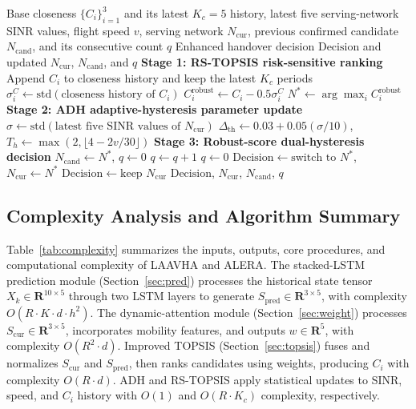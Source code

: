 \documentclass[preprint,12pt]{elsarticle}
\begin{document}
\begin{algorithm}[H]
\caption{ALERA risk-aware vertical-handover enhancement procedure}
\label{alg:alera}
\small
\begin{algorithmic}[1]
\Require Base closeness $\{C_i\}_{i=1}^{3}$ and its latest $K_c=5$ history, latest five serving-network SINR values, flight speed $v$, serving network $N_{\mathrm{cur}}$, previous confirmed candidate $N_{\mathrm{cand}}$, and its consecutive count $q$
\Ensure Enhanced handover decision $\mathrm{Decision}$ and updated $N_{\mathrm{cur}}$, $N_{\mathrm{cand}}$, and $q$
\State \textbf{Stage 1: RS-TOPSIS risk-sensitive ranking}
 \State Append $C_i$ to closeness history and keep the latest $K_c$ periods
 \State $\sigma_i^C\gets\mathrm{std}(\text{closeness history of }C_i)$
 \State $C_i^{\mathrm{robust}}\gets C_i-0.5\sigma_i^C$
\EndFor
\State $N^*\gets\arg\max_i C_i^{\mathrm{robust}}$
\State \textbf{Stage 2: ADH adaptive-hysteresis parameter update}
\State $\sigma\gets\mathrm{std}(\text{latest five SINR values of }N_{\mathrm{cur}})$
\State $\Delta_{\mathrm{th}}\gets0.03+0.05(\sigma/10)$, $T_h\gets\max(2,\lfloor4-2v/30\rfloor)$
\State \textbf{Stage 3: Robust-score dual-hysteresis decision}
 \State $N_{\mathrm{cand}}\gets N^*$, $q\gets0$
\EndIf
{}
 \State $q\gets q+1$
\Else
 \State $q\gets0$
\EndIf
{}
 \State $\mathrm{Decision}\gets\text{switch to }N^*$, $N_{\mathrm{cur}}\gets N^*$
\Else
 \State $\mathrm{Decision}\gets\text{keep }N_{\mathrm{cur}}$
\EndIf
\State \Return $\mathrm{Decision}$, $N_{\mathrm{cur}}$, $N_{\mathrm{cand}}$, $q$
\end{algorithmic}
\end{algorithm}

\subsection{Complexity Analysis and Algorithm Summary}\label{sec:complexity}

Table~\ref{tab:complexity} summarizes the inputs, outputs, core procedures, and computational complexity of LAAVHA and ALERA. The stacked-LSTM prediction module (Section~\ref{sec:pred}) processes the historical state tensor $X_k\in\mathbf{R}^{10\times5}$ through two LSTM layers to generate $S_{\mathrm{pred}}\in\mathbf{R}^{3\times5}$, with complexity $O(R\cdot K\cdot d\cdot h^2)$. The dynamic-attention module (Section~\ref{sec:weight}) processes $S_{\mathrm{cur}}\in\mathbf{R}^{3\times5}$, incorporates mobility features, and outputs $w\in\mathbf{R}^5$, with complexity $O(R^2\cdot d)$. Improved TOPSIS (Section~\ref{sec:topsis}) fuses and normalizes $S_{\mathrm{cur}}$ and $S_{\mathrm{pred}}$, then ranks candidates using weights, producing $C_i$ with complexity $O(R\cdot d)$. ADH and RS-TOPSIS apply statistical updates to SINR, speed, and $C_i$ history with $O(1)$ and $O(R\cdot K_c)$ complexity, respectively.
\end{document}
